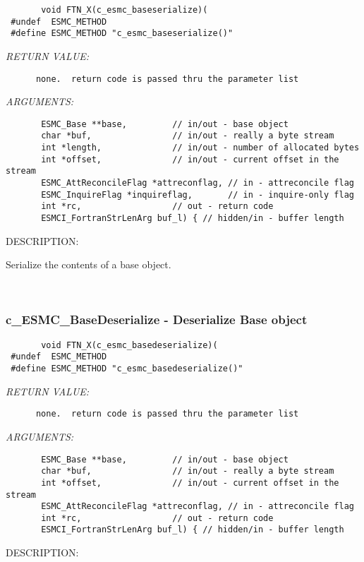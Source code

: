   
\begin{verbatim}       void FTN_X(c_esmc_baseserialize)(
 #undef  ESMC_METHOD
 #define ESMC_METHOD "c_esmc_baseserialize()"\end{verbatim}{\em RETURN VALUE:}
\begin{verbatim}      none.  return code is passed thru the parameter list
   \end{verbatim}{\em ARGUMENTS:}
\begin{verbatim}       ESMC_Base **base,         // in/out - base object
       char *buf,                // in/out - really a byte stream
       int *length,              // in/out - number of allocated bytes
       int *offset,              // in/out - current offset in the stream
       ESMC_AttReconcileFlag *attreconflag, // in - attreconcile flag
       ESMC_InquireFlag *inquireflag,       // in - inquire-only flag
       int *rc,                  // out - return code
       ESMCI_FortranStrLenArg buf_l) { // hidden/in - buffer length
   \end{verbatim}
{\sf DESCRIPTION:\\ }


       Serialize the contents of a base object.
   
 
\mbox{}\hrulefill\
 
\subsubsection [c\_ESMC\_BaseDeserialize] {c\_ESMC\_BaseDeserialize - Deserialize Base object }


  
\begin{verbatim}       void FTN_X(c_esmc_basedeserialize)(
 #undef  ESMC_METHOD
 #define ESMC_METHOD "c_esmc_basedeserialize()"\end{verbatim}{\em RETURN VALUE:}
\begin{verbatim}      none.  return code is passed thru the parameter list
   \end{verbatim}{\em ARGUMENTS:}
\begin{verbatim}       ESMC_Base **base,         // in/out - base object
       char *buf,                // in/out - really a byte stream
       int *offset,              // in/out - current offset in the stream
       ESMC_AttReconcileFlag *attreconflag, // in - attreconcile flag
       int *rc,                  // out - return code
       ESMCI_FortranStrLenArg buf_l) { // hidden/in - buffer length
   \end{verbatim}
{\sf DESCRIPTION:\\ }


